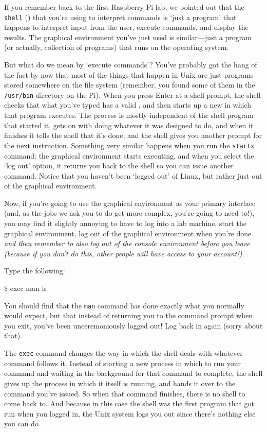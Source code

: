 If you remember back to the first Raspberry Pi lab, we pointed out that the \texttt{shell} () that you're using to interpret commands is `just a program' that happens to interpret input from the user, execute commands, and display the results. The graphical environment you've just used is similar---just a program (or actually, collection of programs) that runs on the operating system.

But what do we mean by `execute commands'? You've probably got the hang of the fact by now that most of the things that happen in Unix are just programs stored somewhere on the file system (remember, you found some of them in the \texttt{/usr/bin} directory on the Pi). When you press Enter at a shell prompt, the  shell checks that what you've typed has a valid , and then starts up a new  in which that program executes. The process is mostly independent of the shell program that started it, gets on with doing whatever it was designed to do, and when it finishes it tells the shell that it's done, and the shell gives you another prompt for the next instruction. Something very similar happens when you run the \texttt{startx} command: the graphical environment starts executing, and when you select the `log out' option, it returns you back to the shell so you can issue another command. Notice that you haven't been `logged out' of Linux, but rather just out of the graphical environment. 

Now, if you're going to use the graphical environment as your primary interface (and, as the jobs we ask you to do get more complex, you're going to need to!), you may find it slightly annoying to have to log into a lab machine, start the graphical environment, log out of the graphical environment when you're done \textit{and then remember to also log out of the console environment before you leave (because if you don't do this, other people will have access to your account!)}. 

Type the following:

\begin{ttoutenv}
\$ exec man ls
\end{ttoutenv}

You should find that the \texttt{man} command has done exactly what you normally would expect, but that instead of returning you to the command prompt when you exit, you've been unceremoniously logged out! Log back in again (sorry about that). 

The \texttt{exec} command changes the way in which the shell deals with whatever command follows it. Instead of starting a new process in which to run your command and waiting in the background for that command to complete, the shell gives up the process in which it itself is running, and hands it over to the command you've issued. So when that command finishes, there is no shell to come back to. And because in this case the shell was the first program that got run when you logged in, the Unix system logs you out since there's nothing else you can do. 

